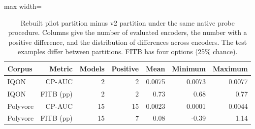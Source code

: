 \begin{table}[htbp]\centering\small
\caption{Rebuilt pilot partition minus v2 partition under the same native probe procedure. Columns give the number of evaluated encoders, the number with a positive difference, and the distribution of differences across encoders. The test examples differ between partitions. FITB has four options (25\% chance).}\label{tab:Partitions}
\begin{adjustbox}{max width=\linewidth}
\begin{tabular}{@{}lrrrrrr@{}}\toprule
Corpus & Metric & Models & Positive & Mean & Minimum & Maximum\\\midrule
IQON & CP-AUC & 2 & 2 & 0.0075 & 0.0073 & 0.0077\\
IQON & FITB (pp) & 2 & 2 & 0.73 & 0.68 & 0.77\\
Polyvore & CP-AUC & 15 & 15 & 0.0023 & 0.0001 & 0.0044\\
Polyvore & FITB (pp) & 15 & 7 & 0.08 & -0.39 & 1.14\\
\bottomrule\end{tabular}\end{adjustbox}\end{table}
